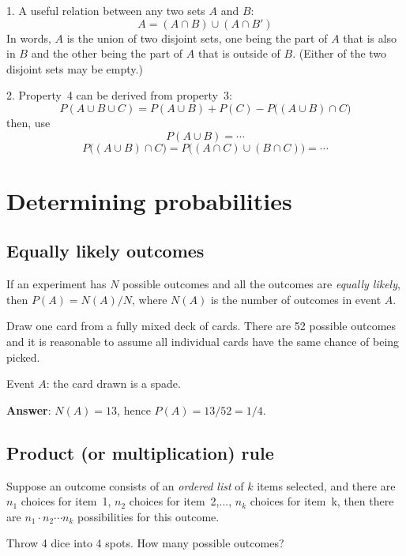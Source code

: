 \documentclass[12pt]{article}
\begin{document}
\alert
1. A useful relation between any two sets $A$ and $B$:
\[ A = (A \cap B) \cup (A \cap B') \]
In words,
$A$ is the union of two disjoint sets,
one being the part of $A$ that is also in $B$
and the other being the part of $A$ that is outside of $B$.
(Either of the two disjoint sets may be empty.)

2. Property~4 can be derived from property~3:
\[
P(A\cup B\cup C)
= P(A\cup B) + P(C) - P\bigl((A\cup B) \cap C\bigr)
\]
then, use
\[
P(A\cup B) = \dotsb
\]
\[
P\bigl((A\cup B)\cap C\bigr)
= P\bigl((A\cap C) \cup (B\cap C)\bigr)
=\dotsb
\]


\section{Determining probabilities}

\subsection{Equally likely outcomes}
\label{sec:equal-likely}

If an experiment has $N$ possible outcomes and all the outcomes are
\emph{equally likely}, then $P(A) = N(A) / N$,
where $N(A)$ is the number of outcomes in event $A$.

\example
Draw one card from a fully mixed deck of cards.
There are 52 possible outcomes and
it is reasonable to assume all individual cards
have the same chance of being picked.

Event $A$: the card drawn is a spade.

\textbf{Answer}: $N(A) = 13$, hence $P(A) = 13/52 = 1/4$.


\subsection{Product (or multiplication) rule}
\label{sec:product-rule}

Suppose an outcome consists of an \emph{ordered list} of $k$ items selected,
and there are $n_1$ choices for item~1,
$n_2$ choices for item~2,...,
$n_k$ choices for item~k,
then there are $n_1 \cdot n_2 \dotsb n_k$
possibilities for this outcome.


\example
Throw 4 dice into 4 spots.
How many possible outcomes?
\end{document}
